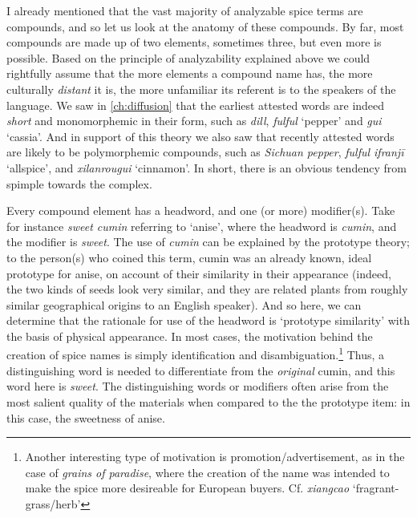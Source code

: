I already mentioned that the vast majority of analyzable spice terms are compounds, and so let us look at the anatomy of these compounds. By far, most compounds are made up of two elements, sometimes three, but even more is possible. Based on the principle of analyzability explained above we could rightfully assume that the more elements a compound name has, the more culturally \textit{distant} it is, the more unfamiliar its referent is to the speakers of the language. We saw in \cref{ch:diffusion} that the earliest attested words are indeed \textit{short} and monomorphemic in their form, such as \textit{dill}, \textit{fulful} `pepper' and \textit{gui} `cassia'. And in support of this theory we also saw that recently attested words are likely to be polymorphemic compounds, such as \textit{Sichuan pepper}, \textit{fulful ifranjī} `allspice', and \textit{xilanrougui} `cinnamon'. In short, there is an obvious tendency from spimple towards the complex.

Every compound element has a headword, and one (or more) modifier(s). Take for instance \textit{sweet cumin} referring to `anise', where the headword is \textit{cumin}, and the modifier is \textit{sweet}. The use of \textit{cumin} can be explained by the prototype theory; to the person(s) who coined this term, cumin was an already known, ideal prototype for anise, on account of their similarity in their appearance (indeed, the two kinds of seeds look very similar, and they are related plants from roughly similar geographical origins to an English speaker). And so here, we can determine that the rationale for use of the headword is `prototype similarity' with the basis of physical appearance. In most cases, the motivation behind the creation of spice names is simply identification and disambiguation.\footnote{Another interesting type of motivation is promotion/advertisement, as in the case of \textit{grains of paradise}, where the creation of the name was intended to make the spice more desireable for European buyers. Cf. \textit{xiangcao} `fragrant-grass/herb'} Thus, a distinguishing word is needed to differentiate from the \textit{original} cumin, and this word here is \textit{sweet}. The distinguishing words or modifiers often arise from the most salient quality of the materials when compared to the the prototype item: in this case, the sweetness of anise.

